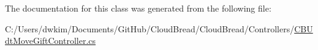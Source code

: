 The documentation for this class was generated from the following file\+:\begin{DoxyCompactItemize}
\item 
C\+:/\+Users/dwkim/\+Documents/\+Git\+Hub/\+Cloud\+Bread/\+Cloud\+Bread/\+Controllers/\hyperlink{_c_b_udt_move_gift_controller_8cs}{C\+B\+Udt\+Move\+Gift\+Controller.\+cs}\end{DoxyCompactItemize}
